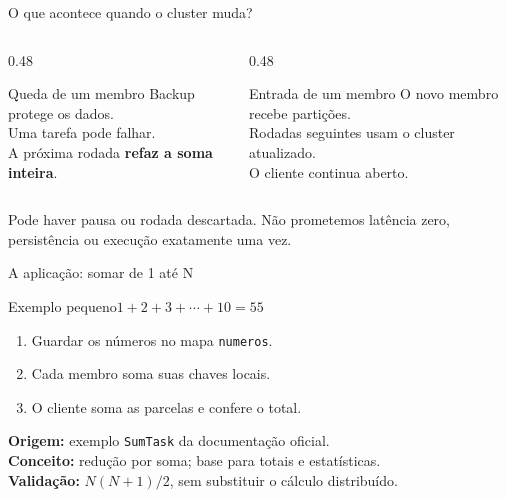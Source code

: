 \documentclass[aspectratio=169,11pt]{beamer}
\begin{document}
\begin{frame}{O que acontece quando o cluster muda?}
\begin{columns}[T]
\begin{column}{0.48\textwidth}\begin{block}{Queda de um membro}
Backup protege os dados.\\[0.15cm]Uma tarefa pode falhar.\\[0.15cm]A próxima rodada \textbf{refaz a soma inteira}.
\end{block}\end{column}
\begin{column}{0.48\textwidth}\begin{block}{Entrada de um membro}
O novo membro recebe partições.\\[0.15cm]Rodadas seguintes usam o cluster atualizado.\\[0.15cm]O cliente continua aberto.
\end{block}\end{column}
\end{columns}
\vspace{0.3cm}Pode haver pausa ou rodada descartada. Não prometemos latência zero, persistência ou execução exatamente uma vez.
\end{frame}

\begin{frame}{A aplicação: somar de 1 até N}
\begin{block}{Exemplo pequeno}$1+2+3+\cdots+10=55$\end{block}
\begin{enumerate}\setlength\itemsep{0.18cm}
\item Guardar os números no mapa \texttt{numeros}.
\item Cada membro soma suas chaves locais.
\item O cliente soma as parcelas e confere o total.
\end{enumerate}
\vspace{0.15cm}
\textbf{Origem:} exemplo \texttt{SumTask} da documentação oficial.\\
\textbf{Conceito:} redução por soma; base para totais e estatísticas.\\
\textbf{Validação:} $N(N+1)/2$, sem substituir o cálculo distribuído.
\end{frame}
\end{document}
